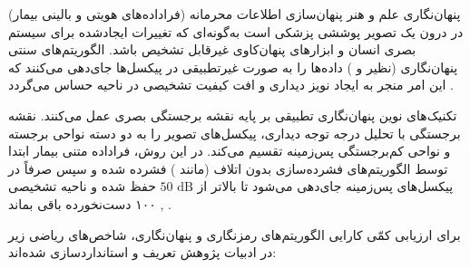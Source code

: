 


پنهان‌نگاری  علم و هنر پنهان‌سازی اطلاعات محرمانه (فراداده‌های هویتی و بالینی بیمار) در درون یک تصویر پوششی پزشکی است به‌گونه‌ای که تغییرات ایجادشده برای سیستم بصری انسان  و ابزارهای پنهان‌کاوی  غیرقابل تشخیص باشد. الگوریتم‌های سنتی پنهان‌نگاری (نظیر  و ) داده‌ها را به صورت غیرتطبیقی در پیکسل‌ها جای‌دهی می‌کنند که این امر منجر به ایجاد نویز دیداری و افت کیفیت تشخیصی در ناحیه حساس  می‌گردد .\par



تکنیک‌های نوین پنهان‌نگاری تطبیقی بر پایه نقشه برجستگی بصری  عمل می‌کنند. نقشه برجستگی با تحلیل درجه توجه دیداری، پیکسل‌های تصویر را به دو دسته نواحی برجسته  و نواحی کم‌برجستگی پس‌زمینه  تقسیم می‌کند. در این روش، فراداده متنی بیمار ابتدا توسط الگوریتم‌های فشرده‌سازی بدون اتلاف (مانند ) فشرده شده و سپس صرفاً در پیکسل‌های پس‌زمینه جای‌دهی می‌شود تا  بالاتر از $50\text{ dB}$ حفظ شده و ناحیه تشخیصی  ۱۰۰ دست‌نخورده باقی بماند , .\par







برای ارزیابی کمّی کارایی الگوریتم‌های رمزنگاری و پنهان‌نگاری، شاخص‌های ریاضی زیر در ادبیات پژوهش تعریف و استانداردسازی شده‌اند:\par

